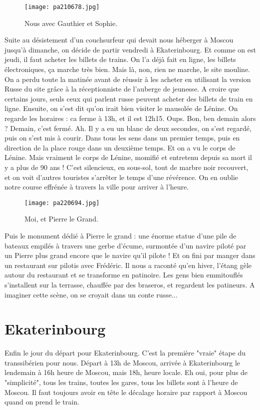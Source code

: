 \documentclass{book}
\begin{document}
\begin{figure}[h]
\centering
\texttt{[image: pa210678.jpg]}
\caption*{ Nous avec Gauthier et Sophie.}
\end{figure}

Suite au désistement d'un couchsurfeur qui devait nous héberger à Moscou jusqu'à dimanche, on décide de partir vendredi à Ekaterinbourg. Et comme on est jeudi, il faut acheter les billets de trains. On l'a déjà fait en ligne, les billets électroniques, ça marche très bien. Mais là, non, rien ne marche, le site mouline. On a perdu toute la matinée avant de réussir à les acheter en utilisant la version Russe du site grâce à la réceptionniste de l'auberge de jeunesse. A croire que certains jours, seuls ceux qui parlent russe peuvent acheter des billets de train en ligne.
Ensuite, on s'est dit qu'on irait bien visiter le mausolée de Lénine. On regarde les horaires : ca ferme à 13h, et il est 12h15. Oups. Bon, ben demain alors ? Demain, c'est fermé. Ah. Il y a eu un blanc de deux secondes, on s'est regardé, puis on s'est mis à courir. Dans tous les sens dans un premier temps, puis en direction de la place rouge dans un deuxième temps. Et on a vu le corps de Lénine. Mais vraiment le corps de Lénine, momifié et entretenu depuis sa mort il y a plus de 90 ans ! C'est silencieux, en sous-sol, tout de marbre noir recouvert, et on voit d'autres touristes s'arrêter le temps d'une révérence. On en oublie notre course effrénée à travers la ville pour arriver à l'heure.


\begin{figure}[h]
\centering
\texttt{[image: pa220694.jpg]}
\caption*{ Moi, et Pierre le Grand.}
\end{figure}

Puis le monument dédié à Pierre le grand : une énorme statue d'une pile de bateaux empilés à travers une gerbe d'écume, surmontée d'un navire piloté par un Pierre plus grand encore que le navire qu'il pilote !
Et on fini par manger dans un restaurant sur pilotis avec Frédéric. Il nous a raconté qu'en hiver, l'étang gèle autour du restaurant et se transforme en patinoire. Les gens bien emmitouflés s'installent sur la terrasse, chauffée par des braseros, et regardent les patineurs. A imaginer cette scène, on se croyait dans un conte russe...

\chapter{Ekaterinbourg}
Enfin le jour du départ pour Ekaterinbourg.
C'est la première "vraie" étape du transsibérien pour nous. Départ à 13h de Moscou, arrivée à Ekaterinbourg le lendemain à 16h heure de Moscou, mais 18h, heure locale. Eh oui, pour plus de "simplicité", tous les trains, toutes les gares, tous les billets sont à l'heure de Moscou. Il faut toujours avoir en tête le décalage horaire par rapport à Moscou quand on prend le train.
\end{document}
